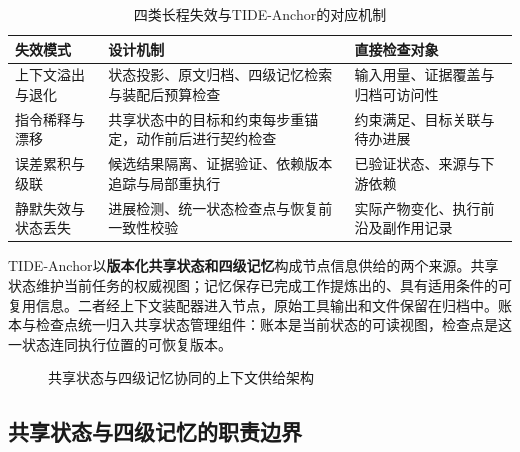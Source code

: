 \begin{table}[htbp]
\centering
\caption{四类长程失效与TIDE-Anchor的对应机制}
\label{tab:anchor_failure_mapping}
\begin{tabular}{p{}p{}p{}}
\toprule
失效模式 & 设计机制 & 直接检查对象 \\
\midrule
上下文溢出与退化 & 状态投影、原文归档、四级记忆检索与装配后预算检查 & 输入用量、证据覆盖与归档可访问性 \\
指令稀释与漂移 & 共享状态中的目标和约束每步重锚定，动作前后进行契约检查 & 约束满足、目标关联与待办进展 \\
误差累积与级联 & 候选结果隔离、证据验证、依赖版本追踪与局部重执行 & 已验证状态、来源与下游依赖 \\
静默失效与状态丢失 & 进展检测、统一状态检查点与恢复前一致性校验 & 实际产物变化、执行前沿及副作用记录 \\
\bottomrule
\end{tabular}
\end{table}

TIDE-Anchor以\textbf{版本化共享状态和四级记忆}构成节点信息供给的两个来源。共享状态维护当前任务的权威视图；记忆保存已完成工作提炼出的、具有适用条件的可复用信息。二者经上下文装配器进入节点，原始工具输出和文件保留在归档中。账本与检查点统一归入共享状态管理组件：账本是当前状态的可读视图，检查点是这一状态连同执行位置的可恢复版本。

\begin{figure}[htbp]
\centering
{}
\caption{共享状态与四级记忆协同的上下文供给架构}
\label{fig:anchor_memory}
\label{fig:anchor_context}
\end{figure}

\subsection{共享状态与四级记忆的职责边界}

